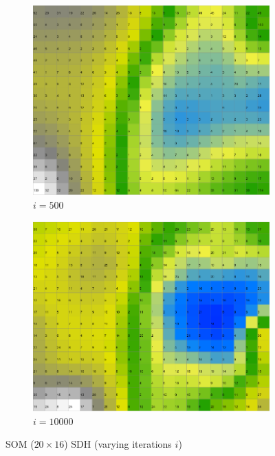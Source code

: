 \documentclass{acm_proc_article-sp}
\begin{document}
\begin{figure}
\begin{subfigure}[b]{0.24\linewidth}
    \end{subfigure}
    \begin{subfigure}[b]{0.24\linewidth}
        \includegraphics[width=\linewidth]{img/wine-newmid-activity-histogram-i-500}
        \caption{$i=500$}
        \label{fig:wine-newmid-activity-histogram-i-500}
    \end{subfigure}
    \begin{subfigure}[b]{0.24\linewidth}
        \includegraphics[width=\linewidth]{img/wine-newmid-activity-histogram-i-10000}
        \caption{$i=10000$}
        \label{fig:wine-newmid-activity-histogram-i-10000}
    \end{subfigure}
    \caption{SOM ($20\times16$) SDH (varying iterations $i$)}
    \label{fig:wine-newmid-activity-histogram-i}
\end{figure}
\end{document}
